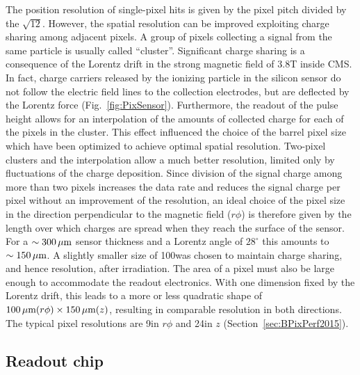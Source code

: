 The position resolution of single-pixel hits is given by the pixel pitch divided by the $\sqrt{12}$.
However, the spatial resolution can be improved exploiting charge sharing among adjacent pixels. A group of pixels collecting a signal from the same particle is usually called ``cluster''.
Significant charge sharing is a consequence of the Lorentz drift in the strong magnetic field of 3.8\unit{T} inside CMS.
In fact, charge carriers released by the ionizing particle in the silicon sensor do not follow the electric field lines to the collection electrodes, but are deflected by the Lorentz force (Fig.~\ref{fig:PixSensor}).
Furthermore, the readout of the pulse height allows for an interpolation of the amounts of collected charge for each of the pixels in the cluster.
This effect influenced the choice of the barrel pixel size which have been optimized to achieve optimal spatial resolution.
Two-pixel clusters and the interpolation allow a much better resolution, limited only by fluctuations of the charge deposition.
Since division of the signal charge among more than two pixels increases the data rate and reduces the signal charge per pixel without an improvement of the resolution, an ideal choice of the pixel size in the direction perpendicular to the magnetic field ($r\phi$) is therefore given by the length over which charges are spread when they reach the surface of the sensor.
For a $\sim300\,\mu\text{m}$ sensor thickness and a Lorentz angle of $28^\circ$ this amounts to $\sim150\,\mu\text{m}$.
A slightly smaller size of 100\mum was chosen to maintain charge sharing, and hence resolution, after irradiation.
The area of a pixel must also be large enough to accommodate the readout electronics.
With one dimension fixed by the Lorentz drift, this leads to a more or less quadratic shape of $100\,\mu\text{m}(r\phi)\times150\,\mu\text{m}(z)$, resulting in comparable resolution in both directions.
The typical pixel resolutions are 9\mum in $r\phi$ and 24\mum in $z$ (Section~\ref{sec:BPixPerf2015}).

\subsection{Readout chip}\label{subsec:BPix_ROC}

